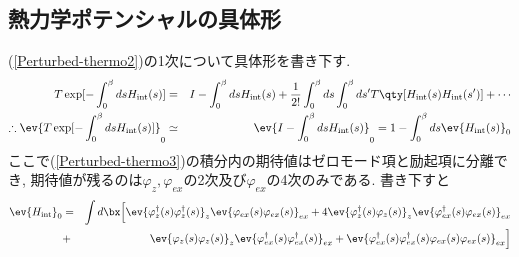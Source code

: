 \documentclass[10.5pt,a4paper]{jreport}
\begin{document}
\subsection{熱力学ポテンシャルの具体形}
(\ref{Perturbed-thermo2})の1次について具体形を書き下す. 
\begin{eqnarray}
  \nonumber  T\exp[-\int_0^\beta ds H_{\rm int}(s)] &=& I -\int_0^{\beta}ds H_{\rm int}(s) + \frac{1}{2!}\int_0^\beta ds\int_0^\beta ds' T\qty[H_{\rm int}(s)H_{\rm int}(s')] + \cdots\\
  \therefore \ev{T\exp[-\int_0^\beta ds H_{\rm int}(s)]}_0 &\simeq& \ev{I -\int_0^{\beta}ds H_{\rm int}(s)}_0 =  1 - \int_0^\beta ds\ev{H_{\rm int}(s)}_0\label{Perturbed-thermo3}
\end{eqnarray}
ここで(\ref{Perturbed-thermo3})の積分内の期待値はゼロモード項と励起項に分離でき, 期待値が残るのは$\varphi_z, \varphi_{ex}$の2次及び$\varphi_{ex}$の4次のみである. 書き下すと
\begin{eqnarray}
  \nonumber  \ev{H_{\rm int}}_0 &=& \int d\bx\Bigl[\ev{\varphi_z^\dagger(s)\varphi_z^\dagger(s)}_z\ev{\varphi_{ex}(s)\varphi_{ex}(s)}_{ex} + 4\ev{\varphi_z^\dagger(s)\varphi_z(s)}_z\ev{\varphi_{ex}^\dagger(s)\varphi_{ex}(s)}_{ex}\\
    &+& \ev{\varphi_z(s)\varphi_z(s)}_z\ev{\varphi_{ex}^\dagger(s)\varphi_{ex}^\dagger(s)}_{ex} + \ev{\varphi_{ex}^\dagger(s)\varphi_{ex}^\dagger(s)\varphi_{ex}(s)\varphi_{ex}(s)}_{ex}\Bigr]\label{Hamiltonian-Exp}
\end{eqnarray}

\end{document}

